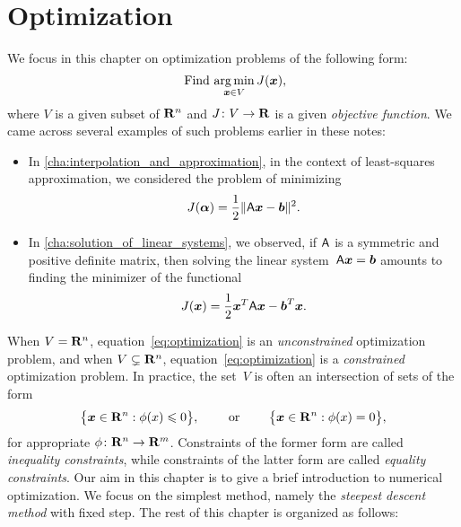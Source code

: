\chapter{Optimization}%
\label{cha:Optimization}

\minitoc

We focus in this chapter on optimization problems of the following form:
\begin{equation}
    \label{eq:optimization}
    \text{ Find $\operatorname*{arg\,min}_{\mathbf{\boldsymbol{x}} \in V} J(\mathbf{\boldsymbol{x}})$},
\end{equation}
where $V$ is a given subset of $\mathbf R^n$ and $J\colon V \to \mathbf R$ is a given \emph{objective function}.
We came across several examples of such problems earlier in these notes:
\begin{itemize}
    \item
        In \cref{cha:interpolation_and_approximation},
        in the context of least-squares approximation,
        we considered the problem of minimizing
        \[
            J(\mathbf{\boldsymbol{\alpha}}) = \frac{1}{2} \lVert \mathsf A \mathbf{\boldsymbol{x}} - \mathbf{\boldsymbol{b}} \rVert^2.
        \]

    \item
        In \cref{cha:solution_of_linear_systems},
        we observed,
        if $\mathsf A$ is a symmetric and positive definite matrix,
        then solving the linear system~$\mathsf A \mathbf{\boldsymbol{x}} = \mathbf{\boldsymbol{b}}$
        amounts to finding the minimizer of the functional
        \[
            J(\mathbf{\boldsymbol{x}})  = \frac{1}{2} \mathbf{\boldsymbol{x}}^T \mathsf A \mathbf{\boldsymbol{x}} - \mathbf{\boldsymbol{b}}^T \mathbf{\boldsymbol{x}}.
        \]
\end{itemize}
When $V = \mathbf R^n$,
equation~\eqref{eq:optimization} is an \emph{unconstrained} optimization problem,
and when $V \subsetneq \mathbf R^n$,
equation~\eqref{eq:optimization} is a \emph{constrained} optimization problem.
In practice,
the set~$V$ is often an intersection of sets of the form
\[
    \bigl\{ \mathbf{\boldsymbol{x}} \in \mathbf R^n : \phi(x) \leqslant 0 \bigr\},
    \qquad
    \text{ or }
    \qquad
    \bigl\{ \mathbf{\boldsymbol{x}} \in \mathbf R^n : \phi(x) = 0 \bigr\},
\]
for appropriate $\phi\colon \mathbf R^n \to \mathbf R^m$.
Constraints of the former form are called \emph{inequality constraints},
while constraints of the latter form are called \emph{equality constraints}.
Our aim in this chapter is to give a brief introduction to numerical optimization.
We focus on the simplest method,
namely the \emph{steepest descent method} with fixed step.
The rest of this chapter is organized as follows:
